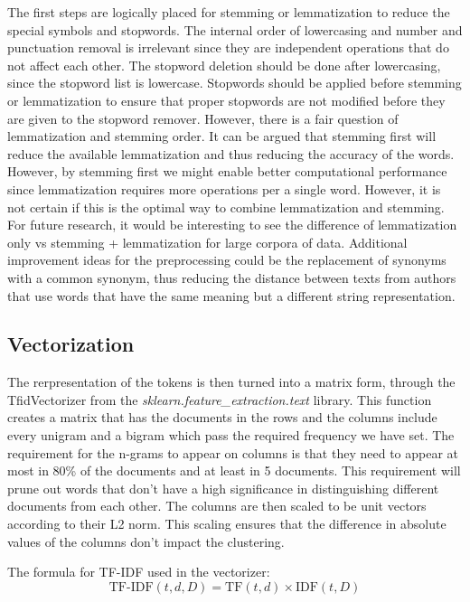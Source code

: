 The first steps are logically placed for stemming or lemmatization to reduce the special symbols and stopwords. The internal order of lowercasing and number and punctuation removal is irrelevant since they are independent operations that do not affect each other. The stopword deletion should be done after lowercasing, since the stopword list is lowercase. Stopwords should be applied before stemming or lemmatization to ensure that proper stopwords are not modified before they are given to the stopword remover. However, there is a fair question of lemmatization and stemming order. It can be argued that stemming first will reduce the available lemmatization and thus reducing the accuracy of the words. However, by stemming first we might enable better computational performance since lemmatization requires more operations per a single word. However, it is not certain if this is the optimal way to combine lemmatization and stemming. For future research, it would be interesting to see the difference of lemmatization only vs stemming + lemmatization for large corpora of data. Additional improvement ideas for the preprocessing could be the replacement of synonyms with a common synonym, thus reducing the distance between texts from authors that use words that have the same meaning but a different string representation.


\subsection{Vectorization}

The rerpresentation of the tokens is then turned into a matrix form, through the TfidVectorizer from the \emph{sklearn.feature\_extraction.text} library. This function creates a matrix that has the documents in the rows and the columns include every unigram and a bigram which pass the required frequency we have set. The requirement for the n-grams to appear on columns is that they need to appear at most in 80\% of the documents and at least in 5 documents. This requirement will prune out words that don't have a high significance in distinguishing different documents from each other. The columns are then scaled to be unit vectors according to their L2 norm. This scaling ensures that the difference in absolute values of the columns don't impact the clustering.



The formula for TF-IDF used in the vectorizer:
\[
    \text{TF-IDF}(t, d, D) = \text{TF}(t, d) \times \text{IDF}(t, D)
\]

